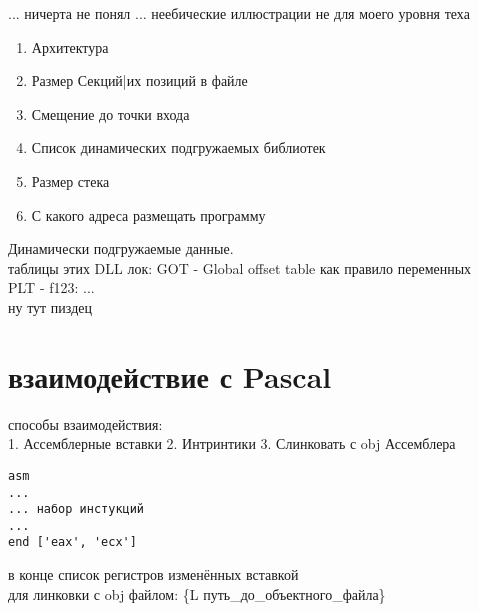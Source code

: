 \documentclass[a4paper, 12pt]{article}
\begin{document}
... ничерта не понял
... неебические иллюстрации не для моего уровня теха
\begin{enumerate}
    \item Архитектура
    \item Размер Секций|их позиций в файле
    \item Смещение до точки входа
    \item Список динамических подгружаемых библиотек
    \item Размер стека
    \item С какого адреса размещать программу 
\end{enumerate}
Динамически подгружаемые данные. \\
таблицы этих DLL лок: GOT - Global offset table как правило переменных\\
PLT - f123: ... \\
ну тут пиздец \\
\section*{взаимодействие с Pascal}
способы взаимодействия: \\
1. Ассемблерные вставки
2. Интринтики
3. Слинковать с obj Ассемблера \\
\begin{lstlisting}
asm
...
... набор инстукций
... 
end ['eax', 'ecx']
\end{lstlisting}
в конце список регистров изменённых вставкой \\
для линковки с obj файлом: \{L путь\_до\_объектного\_файла\}
\newpage
\end{document}
